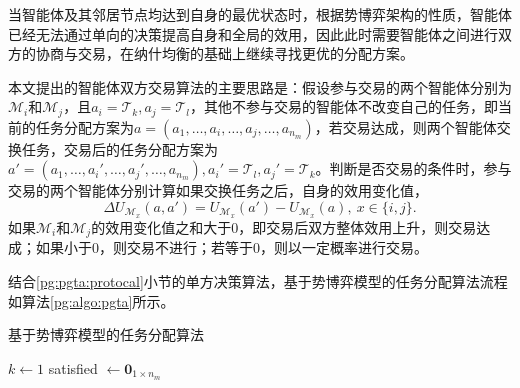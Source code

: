 当智能体及其邻居节点均达到自身的最优状态时，根据势博弈架构的性质，智能体已经无法通过单向的决策提高自身和全局的效用，因此此时需要智能体之间进行双方的协商与交易，在纳什均衡的基础上继续寻找更优的分配方案。

本文提出的智能体双方交易算法的主要思路是：假设参与交易的两个智能体分别为$\mathcal{M}_i$和$\mathcal{M}_j$，且$a_i=\mathcal{T}_k,a_j=\mathcal{T}_l$，其他不参与交易的智能体不改变自己的任务，即当前的任务分配方案为$a=(a_1,\dots,a_i,\dots,a_j,\dots,a_{n_m})$，若交易达成，则两个智能体交换任务，交易后的任务分配方案为$a'=(a_1,\dots,a_i',\dots,a_j',\dots,a_{n_m}),a_i'=\mathcal{T}_l,a_j'=\mathcal{T}_k$。判断是否交易的条件时，参与交易的两个智能体分别计算如果交换任务之后，自身的效用变化值，
\begin{equation}
\label{pg:eq:deltaU}
	\Delta U_{\mathcal{M}_x}(a,a') = U_{\mathcal{M}_x}(a') - U_{\mathcal{M}_x}(a),\ x \in \{i,j\}.
\end{equation}
如果$\mathcal{M}_i$和$\mathcal{M}_j$的效用变化值之和大于0，即交易后双方整体效用上升，则交易达成；如果小于0，则交易不进行；若等于0，则以一定概率进行交易。

结合\ref{pg:pgta:protocal}小节的单方决策算法，基于势博弈模型的任务分配算法流程如算法\ref{pg:algo:pgta}所示。

\begin{algorithm}[htb]
	\caption{基于势博弈模型的任务分配算法}
	\label{pg:algo:pgta}
	\small
	\SetAlgoLined
	$k \gets 1$\;
	satisfied $\gets {\bm 0}_{1 \times n_m}$\;
\end{algorithm}



